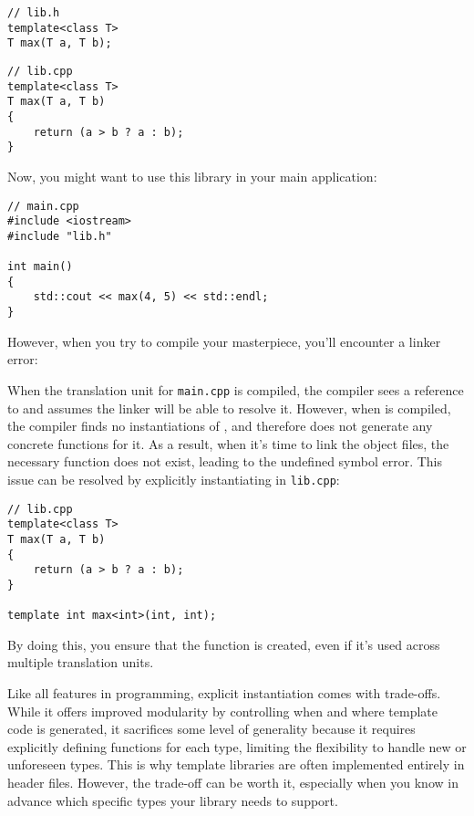 \documentclass[12pt]{article}
\begin{document}
\begin{lstlisting}[style=cxx]
// lib.h
template<class T>
T max(T a, T b);
\end{lstlisting}

\begin{lstlisting}[style=cxx]
// lib.cpp
template<class T>
T max(T a, T b)
{
    return (a > b ? a : b);
}
\end{lstlisting}

\noindent
Now, you might want to use this library in your main application:

\begin{lstlisting}[style=cxx]
// main.cpp
#include <iostream>
#include "lib.h"

int main()
{
    std::cout << max(4, 5) << std::endl;
}
\end{lstlisting}

\noindent
However, when you try to compile your masterpiece, you'll encounter a linker error:


\begin{explanation}
\noindent
When the translation unit for \texttt{main.cpp} is compiled, the compiler sees a reference to  and assumes the linker will be able to resolve it.
However, when  is compiled, the compiler finds no instantiations of , and therefore does not generate any concrete functions for it.
As a result, when it's time to link the object files, the necessary function does not exist, leading to the undefined symbol error.
This issue can be resolved by explicitly instantiating  in \texttt{lib.cpp}:

\begin{lstlisting}[style=cxx]
// lib.cpp
template<class T>
T max(T a, T b)
{
    return (a > b ? a : b);
}

template int max<int>(int, int);
\end{lstlisting}

\noindent
By doing this, you ensure that the function is created, even if it's used across multiple translation units.
\end{explanation}

\noindent
Like all features in programming, explicit instantiation comes with trade-offs.
While it offers improved modularity by controlling when and where template code is generated, it sacrifices some level of generality because it requires explicitly defining functions for each type, limiting the flexibility to handle new or unforeseen types.
This is why template libraries are often implemented entirely in header files.
However, the trade-off can be worth it, especially when you know in advance which specific types your library needs to support.
\end{document}
